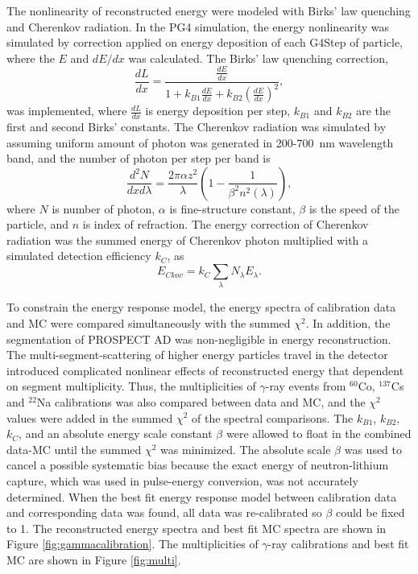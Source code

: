 \documentclass{article}
\begin{document}
The nonlinearity of reconstructed energy were modeled with Birks' law quenching and Cherenkov radiation.
In the PG4 simulation, the energy nonlinearity was simulated by correction applied on energy deposition of each G4Step of particle, where the $E$ and $dE/dx$ was calculated.
The Birks' law quenching correction,
\begin{equation}
    \frac{dL}{dx} = \frac{\frac{dE}{dx}}{1+k_{B1}\frac{dE}{dx}+k_{B2}(\frac{dE}{dx})^2},
\end{equation}
was implemented, where $\frac{dL}{dx}$ is energy deposition per step, $k_{B1}$ and $k_{B2}$ are the first and second Birks' constants.
The Cherenkov radiation was simulated by assuming uniform amount of photon was generated in 200-700~nm wavelength band, and the number of photon per step per band is  
\begin{equation}
    \frac{d^2N}{dxd\lambda} = \frac{2\pi\alpha z^2}{\lambda}\left(1- \frac{1}{\beta^2n^2(\lambda)}\right),
\end{equation}
where $N$ is number of photon, $\alpha$ is fine-structure constant, $\beta$ is the speed of the particle, and $n$ is index of refraction.
The energy correction of Cherenkov radiation was the summed energy of Cherenkov photon multiplied with a simulated detection efficiency $k_{C}$, as
\begin{equation}
    E_{Ckov} = k_{C}\sum_{\lambda}N_\lambda E_\lambda.
\end{equation}

To constrain the energy response model, the energy spectra of calibration data and MC were compared simultaneously with the summed $\chi^2$.
In addition, the segmentation of PROSPECT AD was non-negligible in energy reconstruction. 
The multi-segment-scattering of higher energy particles travel in the detector introduced complicated nonlinear effects of reconstructed energy that dependent on segment multiplicity.
Thus, the multiplicities of $\gamma$-ray events from $^{60}$Co, $^{137}$Cs and $^{22}$Na calibrations was also compared between data and MC, and the $\chi^2$ values were added in the summed $\chi^2$ of the spectral comparisons.
The $k_{B1}$, $k_{B2}$, $k_{C}$, and an absolute energy scale constant $\beta$ were allowed to float in the combined data-MC until the summed $\chi^2$ was minimized.
The absolute scale $\beta$ was used to cancel a possible systematic bias because the exact energy of neutron-lithium capture, which was used in pulse-energy conversion, was not accurately determined.
When the best fit energy response model between calibration data and corresponding data was found, all data was re-calibrated so $\beta$ could be fixed to 1. 
The reconstructed energy spectra and best fit MC spectra are shown in Figure \ref{fig:gammacalibration}.
The multiplicities of $\gamma$-ray calibrations and best fit MC are shown in Figure \ref{fig:multi}.
\end{document}
